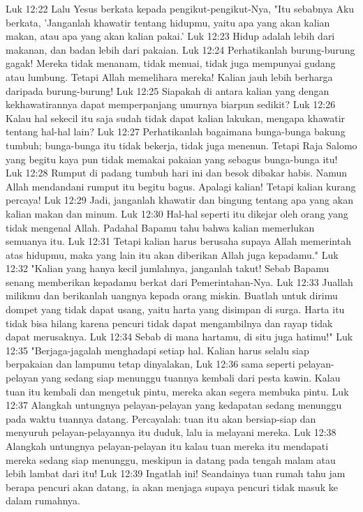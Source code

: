 Luk 12:22  Lalu Yesus berkata kepada pengikut-pengikut-Nya, "Itu sebabnya Aku berkata, 'Janganlah khawatir tentang hidupmu, yaitu apa yang akan kalian makan, atau apa yang akan kalian pakai.'
Luk 12:23  Hidup adalah lebih dari makanan, dan badan lebih dari pakaian.
Luk 12:24  Perhatikanlah burung-burung gagak! Mereka tidak menanam, tidak menuai, tidak juga mempunyai gudang atau lumbung. Tetapi Allah memelihara mereka! Kalian jauh lebih berharga daripada burung-burung!
Luk 12:25  Siapakah di antara kalian yang dengan kekhawatirannya dapat memperpanjang umurnya biarpun sedikit?
Luk 12:26  Kalau hal sekecil itu saja sudah tidak dapat kalian lakukan, mengapa khawatir tentang hal-hal lain?
Luk 12:27  Perhatikanlah bagaimana bunga-bunga bakung tumbuh; bunga-bunga itu tidak bekerja, tidak juga menenun. Tetapi Raja Salomo yang begitu kaya pun tidak memakai pakaian yang sebagus bunga-bunga itu!
Luk 12:28  Rumput di padang tumbuh hari ini dan besok dibakar habis. Namun Allah mendandani rumput itu begitu bagus. Apalagi kalian! Tetapi kalian kurang percaya!
Luk 12:29  Jadi, janganlah khawatir dan bingung tentang apa yang akan kalian makan dan minum.
Luk 12:30  Hal-hal seperti itu dikejar oleh orang yang tidak mengenal Allah. Padahal Bapamu tahu bahwa kalian memerlukan semuanya itu.
Luk 12:31  Tetapi kalian harus berusaha supaya Allah memerintah atas hidupmu, maka yang lain itu akan diberikan Allah juga kepadamu."
Luk 12:32  "Kalian yang hanya kecil jumlahnya, janganlah takut! Sebab Bapamu senang memberikan kepadamu berkat dari Pemerintahan-Nya.
Luk 12:33  Juallah milikmu dan berikanlah uangnya kepada orang miskin. Buatlah untuk dirimu dompet yang tidak dapat usang, yaitu harta yang disimpan di surga. Harta itu tidak bisa hilang karena pencuri tidak dapat mengambilnya dan rayap tidak dapat merusaknya.
Luk 12:34  Sebab di mana hartamu, di situ juga hatimu!"
Luk 12:35  "Berjaga-jagalah menghadapi setiap hal. Kalian harus selalu siap berpakaian dan lampumu tetap dinyalakan,
Luk 12:36  sama seperti pelayan-pelayan yang sedang siap menunggu tuannya kembali dari pesta kawin. Kalau tuan itu kembali dan mengetuk pintu, mereka akan segera membuka pintu.
Luk 12:37  Alangkah untungnya pelayan-pelayan yang kedapatan sedang menunggu pada waktu tuannya datang. Percayalah: tuan itu akan bersiap-siap dan menyuruh pelayan-pelayannya itu duduk, lalu ia melayani mereka.
Luk 12:38  Alangkah untungnya pelayan-pelayan itu kalau tuan mereka itu mendapati mereka sedang siap menunggu, meskipun ia datang pada tengah malam atau lebih lambat dari itu!
Luk 12:39  Ingatlah ini! Seandainya tuan rumah tahu jam berapa pencuri akan datang, ia akan menjaga supaya pencuri tidak masuk ke dalam rumahnya.

